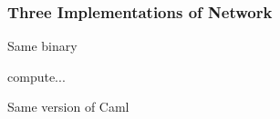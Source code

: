 \documentclass[xcolor=dvipsnames]{beamer}
\let\emph\alert
\begin{document}

\begin{frame}\frametitle {Three Implementations of Network}
  
\emph{Same binary}


\medskip\noindent
{\colorbox{tmpcolor}{\begin{minipage}{\textwidth}\ttfamily\parindent 0pt

\noindent{}\hspace*{1.22ex}compute\hspace*{1.22ex}\hspace*{1.22ex}...
\end{minipage}}}


\medskip\noindent



\bigskip
\emph{Same version of Caml}
    

\medskip\noindent
{\colorbox{tmpcolor}{\begin{minipage}{\textwidth}\ttfamily\parindent 0pt


\end{minipage}}}
\end{frame}
\end{document}
